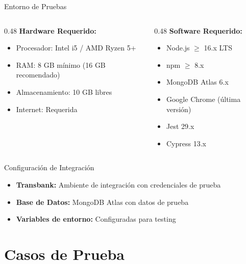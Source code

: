 \documentclass[aspectratio=169]{beamer}
\begin{document}
\begin{frame}{Entorno de Pruebas}
\begin{columns}[T]
\begin{column}{0.48\textwidth}
\textbf{Hardware Requerido:}
\begin{itemize}
    \item Procesador: Intel i5 / AMD Ryzen 5+
    \item RAM: 8 GB mínimo (16 GB recomendado)
    \item Almacenamiento: 10 GB libres
    \item Internet: Requerida
\end{itemize}
\end{column}

\begin{column}{0.48\textwidth}
\textbf{Software Requerido:}
\begin{itemize}
    \item Node.js $\geq$ 16.x LTS
    \item npm $\geq$ 8.x
    \item MongoDB Atlas 6.x
    \item Google Chrome (última versión)
    \item Jest 29.x
    \item Cypress 13.x
\end{itemize}
\end{column}
\end{columns}

\vspace{0.5cm}

\begin{block}{Configuración de Integración}
\begin{itemize}
    \item \textbf{Transbank:} Ambiente de integración con credenciales de prueba
    \item \textbf{Base de Datos:} MongoDB Atlas con datos de prueba
    \item \textbf{Variables de entorno:} Configuradas para testing
\end{itemize}
\end{block}
\end{frame}

\section{Casos de Prueba}
\end{document}
